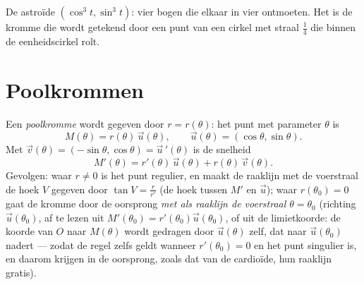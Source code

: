 \begin{omfigure}

{\small De astroïde $(\cos^3 t, \sin^3 t)$: vier bogen die elkaar
in vier  ontmoeten. Het is de kromme die wordt getekend
door een punt van een cirkel met straal $\frac14$ die binnen de
eenheidscirkel rolt.}
\end{omfigure}

\section{Poolkrommen}

\begin{definition}\label{def:b1:curves:polar}
Een \emph{poolkromme} wordt gegeven door $r =
r(\theta)$: het punt met parameter $\theta$ is
\[
M(\theta) = r(\theta)\,\vec u(\theta),
\qquad \vec u(\theta) = (\cos\theta, \sin\theta).
\]
Met $\vec v(\theta) = (-\sin\theta, \cos\theta) = \vec
u\,'(\theta)$ is de snelheid
\[
M'(\theta) = r'(\theta)\, \vec u(\theta) + r(\theta)\, \vec
v(\theta) .
\]
Gevolgen: waar $r \neq 0$ is het punt regulier, en maakt de raaklijn
met de voerstraal de hoek $V$ gegeven door $\tan V = \frac{r}{r'}$
(de hoek tussen $M'$ en $\vec u$); waar $r(\theta_0) = 0$ gaat de
kromme door de oorsprong \emph{met als raaklijn de voerstraal
$\theta = \theta_0$} (richting $\vec u(\theta_0)$, af te lezen uit
$M'(\theta_0) = r'(\theta_0)\vec u(\theta_0)$, of uit de
limietkoorde: de koorde van $O$ naar $M(\theta)$ wordt gedragen
door $\vec u(\theta)$ zelf, dat naar $\vec u(\theta_0)$ nadert ---
zodat de regel zelfs geldt wanneer $r'(\theta_0) = 0$ en het punt
singulier is, en daarom krijgen  in de oorsprong,
zoals dat van de cardioïde, hun raaklijn gratis).
\end{definition}

